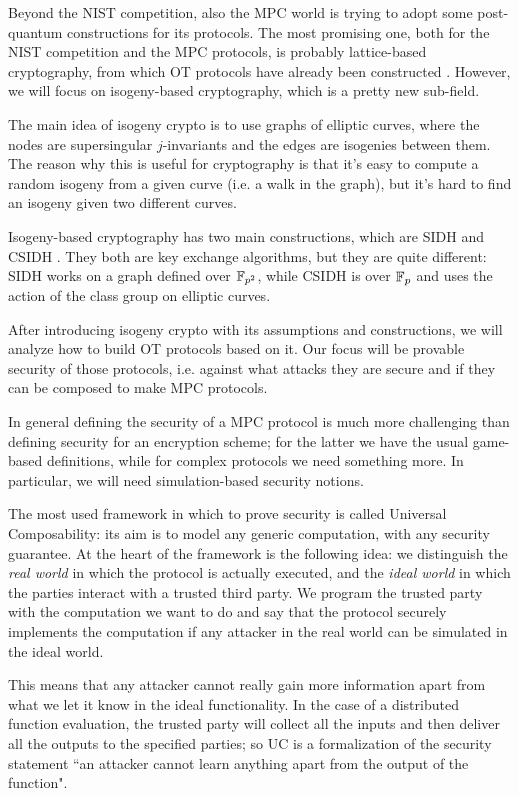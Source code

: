 Beyond the NIST competition, also the MPC world is trying to adopt some post-quantum constructions for its protocols. The most promising one, both for the NIST competition and the MPC protocols, is probably lattice-based cryptography, from which OT protocols have already been constructed \cite{PVW}. However, we will focus on isogeny-based cryptography, which is a pretty new sub-field.

The main idea of isogeny crypto is to use graphs of elliptic curves, where the nodes are supersingular $j$-invariants and the edges are isogenies between them. The reason why this is useful for cryptography is that it's easy to compute a random isogeny from a given curve (i.e. a walk in the graph), but it's hard to find an isogeny given two different curves.

Isogeny-based cryptography has two main constructions, which are SIDH \cite{SIDH11} and CSIDH \cite{CSIDH}. They both are key exchange algorithms, but they are quite different: SIDH works on a graph defined over $\mathbb{F}_{p^2}$, while CSIDH is over $\mathbb{F}_p$ and uses the action of the class group on elliptic curves.

After introducing isogeny crypto with its assumptions and constructions, we will analyze how to build OT protocols based on it. Our focus will be provable security of those protocols, i.e. against what attacks they are secure and if they can be composed to make MPC protocols.

In general defining the security of a MPC protocol is much more challenging than defining security for an encryption scheme; for the latter we have the usual game-based definitions, while for complex protocols we need something more. In particular, we will need simulation-based security notions.

The most used framework in which to prove security is called Universal Composability: its aim is to model any generic computation, with any security guarantee. At the heart of the framework is the following idea: we distinguish the \emph{real world} in which the protocol is actually executed, and the \emph{ideal world} in which the parties interact with a trusted third party. We program the trusted party with the computation we want to do and say that the protocol securely implements the computation if any attacker in the real world can be simulated in the ideal world.

This means that any attacker cannot really gain more information apart from what we let it know in the ideal functionality. In the case of a distributed function evaluation, the trusted party will collect all the inputs and then deliver all the outputs to the specified parties; so UC is a formalization of the security statement ``an attacker cannot learn anything apart from the output of the function".

